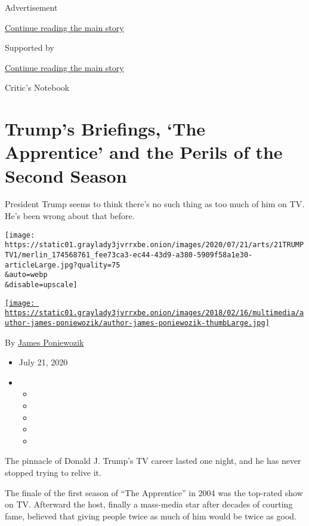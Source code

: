 Advertisement

\protect\hyperlink{after-top}{Continue reading the main story}

Supported by

\protect\hyperlink{after-sponsor}{Continue reading the main story}

Critic's Notebook

\hypertarget{trumps-briefings-the-apprentice-and-the-perils-of-the-second-season}{%
\section{Trump's Briefings, `The Apprentice' and the Perils of the
Second
Season}\label{trumps-briefings-the-apprentice-and-the-perils-of-the-second-season}}

President Trump seems to think there's no such thing as too much of him
on TV. He's been wrong about that before.

\texttt{[image: https://static01.graylady3jvrrxbe.onion/images/2020/07/21/arts/21TRUMPTV1/merlin\_174568761\_fee73ca3-ec44-43d9-a380-5909f58a1e30-articleLarge.jpg?quality=75\\\&auto=webp\\\&disable=upscale]}

\href{https://www.nytimes3xbfgragh.onion/by/james-poniewozik}{\texttt{[image: https://static01.graylady3jvrrxbe.onion/images/2018/02/16/multimedia/author-james-poniewozik/author-james-poniewozik-thumbLarge.jpg]}}

By \href{https://www.nytimes3xbfgragh.onion/by/james-poniewozik}{James
Poniewozik}

\begin{itemize}
\item
  July 21, 2020
\item
  \begin{itemize}
  \item
  \item
  \item
  \item
  \item
  \end{itemize}
\end{itemize}

The pinnacle of Donald J. Trump's TV career lasted one night, and he has
never stopped trying to relive it.

The finale of the first season of ``The Apprentice'' in 2004 was the
top-rated show on TV. Afterward the host, finally a mass-media star
after decades of courting fame, believed that giving people twice as
much of him would be twice as good.

